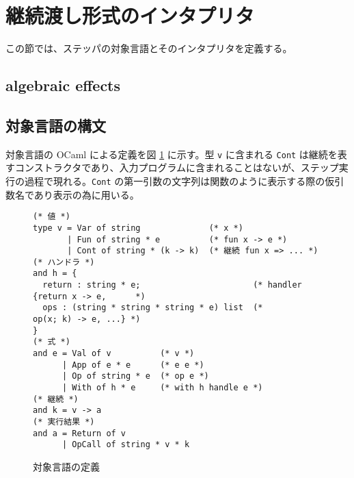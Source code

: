\section{継続渡し形式のインタプリタ}
\label{section:definition}

この節では、ステッパの対象言語とそのインタプリタを定義する。

\subsection{algebraic effects}
\label{subsection:algebraic effects}



\subsection{対象言語の構文}
\label{subsection:syntax}

対象言語の OCaml による定義を図 \ref{figure:syntax} に示す。型 \texttt{v} に含まれる \texttt{Cont} は継続を表すコンストラクタであり、入力プログラムに含まれることはないが、ステップ実行の過程で現れる。\texttt{Cont} の第一引数の文字列は関数のように表示する際の仮引数名であり表示の為に用いる。

\begin{figure}
\begin{verbatim}
(* 値 *)
type v = Var of string              (* x *)
       | Fun of string * e          (* fun x -> e *)
       | Cont of string * (k -> k)  (* 継続 fun x => ... *)
(* ハンドラ *)
and h = {
  return : string * e;                       (* handler {return x -> e,      *)
  ops : (string * string * string * e) list  (*          op(x; k) -> e, ...} *)
}
(* 式 *)
and e = Val of v          (* v *)
      | App of e * e      (* e e *)
      | Op of string * e  (* op e *)
      | With of h * e     (* with h handle e *)
(* 継続 *)
and k = v -> a
(* 実行結果 *)
and a = Return of v
      | OpCall of string * v * k

\end{verbatim}
\caption{対象言語の定義}
\label{figure:syntax}
\end{figure}
